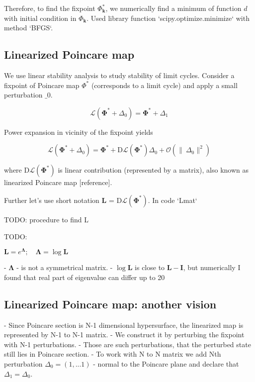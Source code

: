 \documentclass[a4paper,12pt]{article}
\newcommand{\D}{\Delta}%
\begin{document}
Therefore, to find the fixpoint $\Phi^*_{\mathbf{k}}$, we numerically find a minimum of function $d$ with initial condition in $\Phi_{\mathbf{k}}$. Used library function `scipy.optimize.minimize` with method `BFGS`.


\subsection*{ Linearized Poincare map}

We use linear stability analysis to study stability of limit cycles. Consider a fixpoint of Poincare map $\Phi^*$ (corresponds to a limit cycle) and apply a small perturbation $\_0$.

$$\mathcal{L}(\mathbf{\Phi^{*}} + \D_0) = \mathbf{\Phi^{*}} + \D_1$$

Power expansion in vicinity of the fixpoint yields

$$\mathcal{L}(\mathbf{\Phi^{*}} + \D_0) = \mathbf{\Phi^{*}} +  \mathrm{D}\mathcal{L}(\mathbf{\Phi^*}) \D_0 + \mathcal{O}(\lVert\ \D_0 \rVert^2) $$

where $\mathrm{D}\mathcal{L}(\mathbf{\Phi^*})$ is linear contribution (represented by a matrix), also known as linearized Poincare map [reference].

Further let's use short notation $\mathbf{L}$ = $\mathrm{D}\mathcal{L}(\mathbf{\Phi^*})$. In code `Lmat`

TODO: procedure to find L

TODO:

$\mathbf{L} = e^\mathbf{\Lambda}; \quad \mathbf{\Lambda} = \log \mathbf{L} $


- $\mathbf{\Lambda}$ - is not a symmetrical matrix.
- $ \log \mathbf{L}$ is close to $\mathbf{L} - \mathbf{I}$, but numerically I found that real part of eigenvalue can differ up to 20%

\subsection*{Linearized Poincare map: another vision}
- Since Poincare section is N-1 dimensional hypersurface, the linearized map is represented by N-1 to N-1 matrix.
- We construct it by perturbing the fixpoint with N-1 perturbations.
  - Those are such perturbations, that the perturbed state still lies in Poincare section.
  - To work with N to N matrix we add Nth perturbation $\D_0 = (1,...1)$ - normal to the Poincare plane and declare that $\D_1 = \D_0$.
\end{document}
